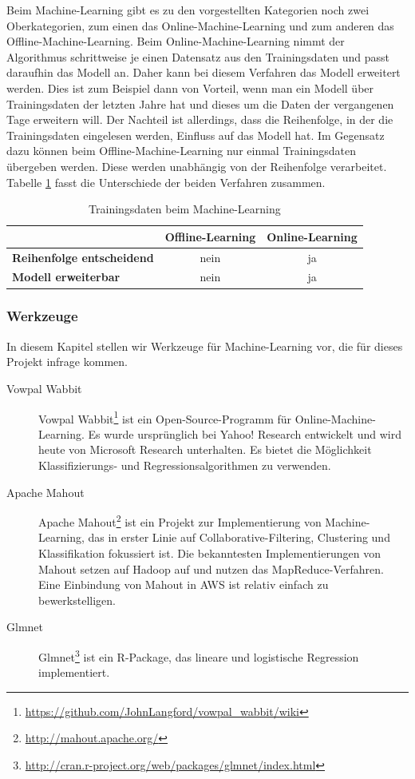 Beim Machine-Learning gibt es zu den vorgestellten Kategorien noch zwei Oberkategorien, zum einen das 
Online-Machine-Learning und zum anderen das Offline-Machine-Learning. 
Beim Online-Machine-Learning nimmt der Algorithmus schrittweise je einen Datensatz aus den Trainingsdaten
und passt daraufhin das Modell an.
Daher kann bei diesem Verfahren das Modell erweitert werden. 
Dies ist zum Beispiel dann von Vorteil, wenn man ein Modell über Trainingsdaten der letzten Jahre hat und dieses um die Daten der vergangenen Tage erweitern will. Der Nachteil ist allerdings, dass die Reihenfolge, in der die Trainingsdaten eingelesen werden, Einfluss auf das Modell hat.
Im Gegensatz dazu können beim Offline-Machine-Learning nur einmal Trainingsdaten übergeben werden. Diese werden unabhängig von der Reihenfolge verarbeitet. Tabelle \ref{tab:MachineLearningTrainingData}
fasst die Unterschiede der beiden Verfahren zusammen.
\\
\begin{table}[H]
	\centering
\begin{tabular}{l|c|c} 
	\textbf{} & \textbf{Offline-Learning} & \textbf{Online-Learning}  \\  
	\hline \textbf{Reihenfolge entscheidend} & nein & ja \\
	\hline \textbf{Modell erweiterbar} & nein & ja 
	\vspace{0.3cm} 
\end{tabular} 
\caption{Trainingsdaten beim Machine-Learning}
\label{tab:MachineLearningTrainingData}
\end{table}
 
\subsubsection{Werkzeuge}
In diesem Kapitel stellen wir Werkzeuge für Machine-Learning vor, die für dieses Projekt infrage kommen.

\begin{description}
\item[Vowpal Wabbit] Vowpal Wabbit\footnote{\url{https://github.com/JohnLangford/vowpal_wabbit/wiki}} ist ein Open-Source-Programm für Online-Machine-Learning. Es wurde ursprünglich bei Yahoo! Research entwickelt und wird heute von Microsoft Research unterhalten. Es bietet die Möglichkeit Klassifizierungs- und Regressionsalgorithmen zu verwenden.

\item[Apache Mahout] Apache Mahout\footnote{\url{http://mahout.apache.org/}} ist ein Projekt zur Implementierung von Machine-Learning, das in erster Linie auf Collaborative-Filtering, Clustering und Klassifikation fokussiert ist. Die bekanntesten Implementierungen von Mahout setzen auf Hadoop auf und nutzen das MapReduce-Verfahren. Eine Einbindung von Mahout in AWS ist relativ einfach zu bewerkstelligen.

\item[Glmnet] Glmnet\footnote{\url{http://cran.r-project.org/web/packages/glmnet/index.html}} ist ein R-Package, das lineare und logistische Regression implementiert.
\end{description}

